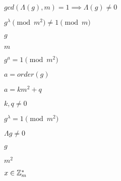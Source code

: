 \documentclass[10pt]{book}
\begin{document}
\begin{mdSnippets}
\begin{mdInlineSnippet}[eb2f993828c05c2a24ff8347d6aa57df]%
$gcd(\Lambda(g), m) = 1 \implies \Lambda(g) \neq 0$\end{mdInlineSnippet}%
\begin{mdInlineSnippet}[251ee982c0751e2e8b0bbdaf015c277e]%
$g^{\lambda} \pmod {m^2} \neq 1 \pmod{m}$\end{mdInlineSnippet}%
\begin{mdInlineSnippet}[b2f5ff47436671b6e533d8dc3614845d]%
$g$\end{mdInlineSnippet}%
\begin{mdInlineSnippet}[6f8f57715090da2632453988d9a1501b]%
$m$\end{mdInlineSnippet}%
\begin{mdInlineSnippet}%
$g^a = 1 \pmod {m^2}$\end{mdInlineSnippet}%
\begin{mdInlineSnippet}[1b03c55266353296bdaeb1c36e8724d9]%
$a = order(g)$\end{mdInlineSnippet}%
\begin{mdInlineSnippet}[1f98ffab4131dd5531f9c299db34a1c2]%
$a = km^2 + q$\end{mdInlineSnippet}%
\begin{mdInlineSnippet}[403096a41733119dc3a3a3da4f4f4b55]%
$k,q \neq 0$\end{mdInlineSnippet}%
\begin{mdInlineSnippet}[12f7d26e2804c63ba4ae782a79fb9e3c]%
$g^{\lambda} =1 \pmod {m^2}$\end{mdInlineSnippet}%
\begin{mdInlineSnippet}[00698eb7ae5382f46ec6c05e20abce63]%
$\Lambda{g} \neq 0$\end{mdInlineSnippet}%
\begin{mdInlineSnippet}[b2f5ff47436671b6e533d8dc3614845d]%
$g$\end{mdInlineSnippet}%
\begin{mdInlineSnippet}[e09d672ddab652ec34133c73dc054f2e]%
$m^2$\end{mdInlineSnippet}%
\begin{mdInlineSnippet}[91b2cc390960a1f0f321929ad7476ed5]%
$x\in \mathbb{Z}^*_m$\end{mdInlineSnippet}%

\end{mdSnippets}
\end{document}
